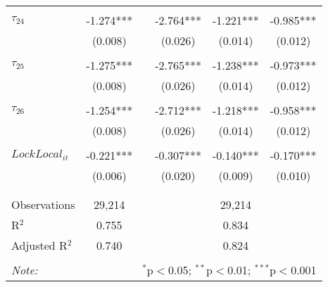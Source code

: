 \begin{tabular}{@{\extracolsep{-0pt}}lccccc}
                &           &&           &           &           \\[-2.1ex]
$\tau_{24}$     & -1.274*** && -2.764*** & -1.221*** & -0.985*** \\
                &  (0.008)  &&  (0.026)  &  (0.014)  &  (0.012)  \\
                &           &&           &           &           \\[-2.1ex]
$\tau_{25}$     & -1.275*** && -2.765*** & -1.238*** & -0.973*** \\
                &  (0.008)  &&  (0.026)  &  (0.014)  &  (0.012)  \\
                &           &&           &           &           \\[-2.1ex]
$\tau_{26}$     & -1.254*** && -2.712*** & -1.218*** & -0.958*** \\
                &  (0.008)  &&  (0.026)  &  (0.014)  &  (0.012)  \\
                &           &&           &           &           \\[-1.ex]
$LockLocal_{it}$ & -0.221*** && -0.307*** & -0.140*** & -0.170*** \\
                &  (0.006)  &&  (0.020)  &  (0.009)  &  (0.010)  \\
                &           &&           &           &           \\[-2.1ex]

\hline \\[-1.8ex] 
Observations     & 29,214 && \multicolumn{3}{c}{29,214} \\ 
R$^{2}$          & 0.755  && \multicolumn{3}{c}{ 0.834} \\ 
Adjusted R$^{2}$ & 0.740  && \multicolumn{3}{c}{ 0.824} \\ 
\hline 
\hline \\[-1.8ex] 
\textit{Note:}  & \multicolumn{5}{r}{$^{*}$p$<$0.05; $^{**}$p$<$0.01; $^{***}$p$<$0.001} \\ 
\end{tabular} 